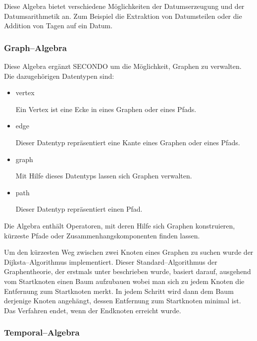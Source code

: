 Diese Algebra bietet verschiedene Möglichkeiten der Datumserzeugung und der Datumsarithmetik an. Zum Beispiel die Extraktion von Datumsteilen oder die Addition von Tagen auf ein Datum.

\subsubsection{Graph--Algebra}

Diese Algebra ergänzt SECONDO um die Möglichkeit, Graphen zu verwalten. Die dazugehörigen Datentypen sind:

\begin{itemize}
\item vertex

Ein Vertex ist eine Ecke in eines Graphen oder eines Pfads.
\item edge

Dieser Datentyp repräsentiert eine Kante eines Graphen oder eines Pfads.
\item graph

Mit Hilfe dieses Datentyps lassen sich Graphen verwalten.
\item path

Dieser Datentyp repräsentiert einen Pfad.
\end{itemize}

Die Algebra enthält Operatoren, mit deren Hilfe sich Graphen konstruieren, kürzeste Pfade oder Zusammenhangskomponenten finden lassen.

Um den kürzesten Weg zwischen zwei Knoten eines Graphen zu suchen wurde der Dijksta--Algorithmus implementiert.  Dieser Standard--Algorithmus der Graphentheorie, der erstmals unter \cite{Dij} beschrieben wurde, basiert darauf, ausgehend vom Startknoten einen Baum aufzubauen wobei man sich zu jedem Knoten die Entfernung zum Startknoten merkt. In jedem Schritt wird dann dem Baum derjenige Knoten angehängt, dessen Entfernung zum Startknoten minimal ist. Das Verfahren endet, wenn der Endknoten erreicht wurde.

\subsubsection{Temporal--Algebra}


